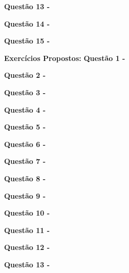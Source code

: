     
    
    \vspace{0.5cm}\textbf{Questão 13 -}
    
    
    
    
    \vspace{0.5cm}\textbf{Questão 14 -}
    
    
    
    \vspace{0.5cm}\textbf{Questão 15 -}
    
    
    \newpage
    \textbf{Exercícios Propostos:}
    \vspace{0.5cm}\textbf{Questão 1 -}
    
    \vspace{0.5cm}\textbf{Questão 2 -}
    
    \vspace{0.5cm}\textbf{Questão 3 -}
    
    \vspace{0.5cm}\textbf{Questão 4 -}
    
    \vspace{0.5cm}\textbf{Questão 5 -}
    
    \vspace{0.5cm}\textbf{Questão 6 -}
    
    \vspace{0.5cm}\textbf{Questão 7 -}
    
    \vspace{0.5cm}\textbf{Questão 8 -}
    
    \vspace{0.5cm}\textbf{Questão 9 -}
    
    \vspace{0.5cm}\textbf{Questão 10 -}
    
    \vspace{0.5cm}\textbf{Questão 11 -}
    
    \vspace{0.5cm}\textbf{Questão 12 -}
    
    \vspace{0.5cm}\textbf{Questão 13 -}
    
